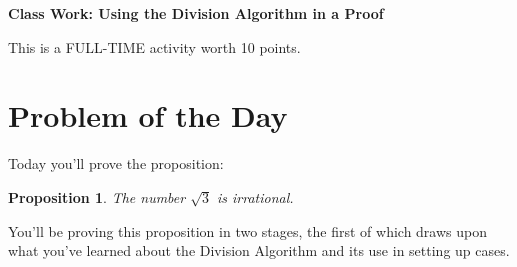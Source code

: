 \documentclass[11pt]{article}
\newtheorem{proposition}{Proposition}
\begin{document}
	
	\thispagestyle{empty}
	\renewcommand{\headrulewidth}{0.0pt}
	\thispagestyle{fancy}
	\lfoot{}
	\cfoot{}
	\rfoot{}	
	
	\vspace*{0in}

		\begin{center}
			\begin{large}
			\textbf{Class Work: Using the Division Algorithm in a Proof} \\
			\end{large}
			This is a FULL-TIME activity worth 10 points. 
			
		\end{center}
		

\section*{Problem of the Day}

Today you'll prove the proposition: 
\begin{proposition}
	The number $\sqrt{3}$ is irrational. 
\end{proposition}
You'll be proving this proposition in two stages, the first of which draws upon what you've learned about the Division Algorithm and its use in setting up cases. 
\end{document}
